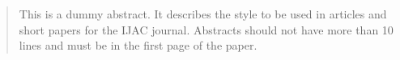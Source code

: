 \begin{abstract}
  This is a dummy abstract. It describes the style to be used in articles and short papers for the IJAC journal. Abstracts should not have more than 10 lines and must be in the first page of the paper.
\end{abstract}